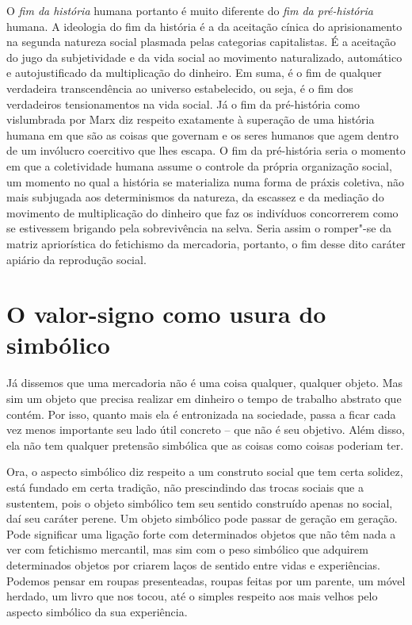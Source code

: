 O \emph{fim da história} humana portanto é muito diferente do \emph{fim
da pré-história} humana. A ideologia do fim da história é a da aceitação
cínica do aprisionamento na segunda natureza social plasmada pelas
categorias capitalistas. É a aceitação do jugo da subjetividade e da
vida social ao movimento naturalizado, automático e autojustificado da
multiplicação do dinheiro. Em suma, é o fim de qualquer verdadeira
transcendência ao universo estabelecido, ou seja, é o fim dos
verdadeiros tensionamentos na vida social. Já o fim da pré-história como
vislumbrada por Marx diz respeito exatamente à superação de uma história
humana em que são as coisas que governam e os seres humanos que agem
dentro de um invólucro coercitivo que lhes escapa. O fim da pré-história
seria o momento em que a coletividade humana assume o controle da
própria organização social, um momento no qual a história se materializa
numa forma de práxis coletiva, não mais subjugada aos determinismos da
natureza, da escassez e da mediação do movimento de multiplicação do
dinheiro que faz os indivíduos concorrerem como se estivessem brigando
pela sobrevivência na selva. Seria assim o romper"-se da matriz
apriorística do fetichismo da mercadoria, portanto, o fim desse dito
caráter apiário da reprodução social.

\section{O valor-signo como usura do simbólico}

Já dissemos que uma mercadoria não é uma coisa qualquer, qualquer
objeto. Mas sim um objeto que precisa realizar em dinheiro o tempo de
trabalho abstrato que contém. Por isso, quanto mais ela é entronizada na
sociedade, passa a ficar cada vez menos importante seu lado útil
concreto -- que não é seu objetivo. Além disso, ela não tem qualquer
pretensão simbólica que as coisas como coisas poderiam ter.

Ora, o aspecto simbólico diz respeito a um construto social que tem
certa solidez, está fundado em certa tradição, não prescindindo das
trocas sociais que a sustentem, pois o objeto simbólico tem seu sentido
construído apenas no social, daí seu caráter perene. Um objeto simbólico
pode passar de geração em geração. Pode significar uma ligação forte com
determinados objetos que não têm nada a ver com fetichismo mercantil,
mas sim com o peso simbólico que adquirem determinados objetos por
criarem laços de sentido entre vidas e experiências. Podemos pensar em
roupas presenteadas, roupas feitas por um parente, um móvel herdado, um
livro que nos tocou, até o simples respeito aos mais velhos pelo aspecto
simbólico da sua experiência.

